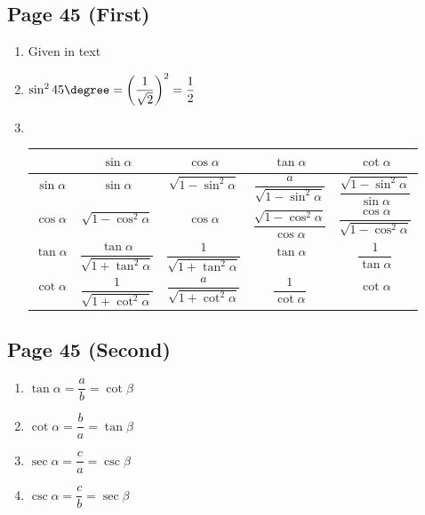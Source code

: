 \documentclass{article}
\newenvironment{solutions}[1]
{\subsection*{#1}
 \begin{enumerate}[leftmargin=1.5em]}
{\end{enumerate}}
\newcommand{\solution}{\item}
\begin{document}
\begin{solutions}{Page 45 (First)}
\solution %
Given in text

\solution %
$\sin^{2}{45\degree} = \left(\dfrac{1}{\sqrt{2}}\right)^2 = \dfrac{1}{2}$

\solution ~ %
\begin{center}
\bgroup
\def\arraystretch{2.1}
\setlength\tabcolsep{15pt}
\begin{tabular}{ |c|c|c|c|c| }
\hline
~              & $\sin{\alpha}$                                      & $\cos{\alpha}$                           & $\tan{\alpha}$                                      & $\cot{\alpha}$ \\
\hline
$\sin{\alpha}$ & $\sin{\alpha}$                                      & $\sqrt{1 - \sin^{2}{\alpha}}$            & $\dfrac{a}{\sqrt{1 - \sin^{2}{\alpha}}}$            & $\dfrac{\sqrt{1 - \sin^{2}{\alpha}}}{\sin{\alpha}}$ \\
\hline
$\cos{\alpha}$ & $\sqrt{1 - \cos^{2}{\alpha}}$                       & $\cos{\alpha}$                           & $\dfrac{\sqrt{1 - \cos^{2}{\alpha}}}{\cos{\alpha}}$ & $\dfrac{\cos{\alpha}}{\sqrt{1 - \cos^{2}{\alpha}}}$ \\
\hline
$\tan{\alpha}$ & $\dfrac{\tan{\alpha}}{\sqrt{1 + \tan^{2}{\alpha}}}$ & $\dfrac{1}{\sqrt{1 + \tan^{2}{\alpha}}}$ & $\tan{\alpha}$                                      & $\dfrac{1}{\tan{\alpha}}$ \\
\hline
$\cot{\alpha}$ & $\dfrac{1}{\sqrt{1 + \cot^{2}{\alpha}}}$            & $\dfrac{a}{\sqrt{1 + \cot^{2}{\alpha}}}$ & $\dfrac{1}{\cot{\alpha}}$                           & $\cot{\alpha}$ \\
\hline
\end{tabular}
\egroup
\end{center}
\end{solutions}


\begin{solutions}{Page 45 (Second)}
\solution $\tan{\alpha} = \dfrac{a}{b} = \cot{\beta}$
\solution $\cot{\alpha} = \dfrac{b}{a} = \tan{\beta}$
\solution $\sec{\alpha} = \dfrac{c}{a} = \csc{\beta}$
\solution $\csc{\alpha} = \dfrac{c}{b} = \sec{\beta}$
\end{solutions}
\end{document}
